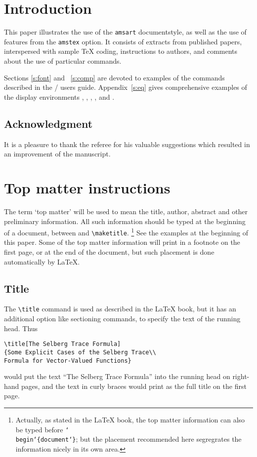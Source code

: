 \tableofcontents

\section{Introduction}
\label{intro}

This paper illustrates the use of the {\tt amsart} documentstyle, as
well as the use of features from the {\tt amstex} option.  It consists
of extracts from published papers,
interspersed with sample \TeX{} coding,
instructions to authors, and comments about the use
of particular commands.

Sections \ref{s:font} and ~\ref{s:comp} are devoted to examples
of the commands described in the \amslatex/ users guide.
Appendix~\ref{s:eq} gives comprehensive examples of the
display environments , , ,
, and .

\subsection{Acknowledgment}
It is a pleasure to thank the referee for his valuable suggestions which
resulted in an improvement of the manuscript.

\section{Top matter instructions}
\label{s:topmatter}

The term `top matter' will be used to mean the title, author, abstract
and other preliminary information.  All such information should be
typed at the beginning of a document, between \verb==
and \verb=\maketitle=.%
%
\footnote{Actually, as stated in the \LaTeX{} book, the top matter
information can also be typed before
{\tt\char`\\begin\char`\{document\char`\}}; but the placement
recommended here segregrates the information nicely in its own area.}
%
See the examples at the beginning of this paper.
Some of the top matter information will print
in a footnote on the first page, or at the end of the
document, but such placement is done automatically by \LaTeX{}.

\subsection{Title} The \verb=\title= command is used as described in
the \LaTeX{} book, but it has an additional option like sectioning
commands, to specify the text of the running head.  Thus
\begin{verbatim}
\title[The Selberg Trace Formula]
{Some Explicit Cases of the Selberg Trace\\
Formula for Vector-Valued Functions}
\end{verbatim}
would put the text ``The Selberg Trace Formula'' into the running head
on right-hand pages, and the text in curly braces would print as the
full title on the first page.

